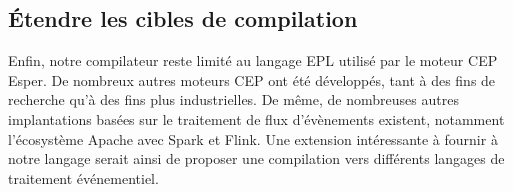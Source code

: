 \subsection*{Étendre les cibles de compilation}
Enfin, notre compilateur reste limité au langage EPL utilisé par le moteur CEP Esper. De nombreux autres moteurs CEP ont été développés, tant à des fins de recherche qu'à des fins plus industrielles.  De même, de nombreuses autres implantations basées sur le traitement de flux d'évènements existent, notamment l'écosystème Apache avec Spark et Flink. Une extension intéressante à fournir à notre langage serait ainsi de proposer une compilation vers différents langages de traitement événementiel.



